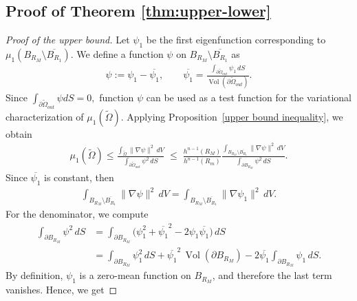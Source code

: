 \documentclass[12pt,reqno]{amsart}
\numberwithin{equation}{section}
\numberwithin{theorem}{section}
\numberwithin{equation}{section}
\numberwithin{theorem}{section}
\begin{document}


\subsection{Proof of  Theorem \ref{thm:upper-lower}}
\begin{proof} [Proof of the upper bound]
Let $\psi_1$ be the first eigenfunction corresponding to $\mu_1\!\left(B_{R_M}\setminus \overline{B_{R_1}}\right)$.  
We define a function $\psi$ on $B_{R_M}\setminus\overline{B_{R_1}}$ as
\begin{align*}
   \psi := \psi_1 - \overline{\psi_1}, 
\qquad 
\overline{\psi_1} = \frac{\displaystyle \int_{\partial \tilde{\Omega}_{out}} \psi_1 \, dS}{\operatorname{Vol}(\partial \tilde{\Omega}_{out})}. 
\end{align*}
Since $\int_{\partial\tilde{\Omega}_{out}} \psi dS=0,$ function $\psi$ can be used as a test function for the variational characterization of $\mu_1(\tilde{\Omega}).$
Applying Proposition~\ref{upper bound inequality}, we obtain
\begin{align} \label{inequality for upper bound}
       \mu_1(\tilde{\Omega})\leq \frac{\displaystyle \int_{\tilde{\Omega}}\|\nabla\psi\|^2 \, dV}{\displaystyle \int_{\partial\tilde{\Omega}_{out}}\psi^2 \, dS} 
        \;\leq\; 
        \frac{h^{n-1}(R_M)}{h^{n-1}(R_m)} 
        \frac{\displaystyle \int_{B_{R_M}\setminus \overline{B_{R_1}}}\|\nabla\psi\|^2 \, dV}{\displaystyle \int_{\partial B_{R_M}}\psi^2 \, dS}.
\end{align}
Since $\overline{\psi_1}$ is constant, then
\begin{align}
    \int_{B_{R_M}\setminus \overline{B_{R_1}}} \|\nabla \psi\|^2 \, dV
    = \int_{B_{R_M}\setminus \overline{B_{R_1}}} \|\nabla \psi_1\|^2 \, dV. \label{equality 1}
\end{align}
For the denominator, we compute
\begin{align*}
    \int_{\partial B_{R_M}} \psi^2 \, dS 
    &= \int_{\partial B_{R_M}} \big(\psi_1^2 + \overline{\psi_1}^2 - 2\psi_1 \overline{\psi_1}\big) \, dS \\
    &= \int_{\partial B_{R_M}} \psi_1^2 \, dS 
       + \overline{\psi_1}^2 \, \operatorname{Vol}(\partial B_{R_M})
       - 2 \overline{\psi_1}\int_{\partial B_{R_M}} \psi_1 \, dS.
\end{align*}
By definition, $\psi_1$ is a zero-mean function on $B_{R_M}$, and therefore the last term vanishes. Hence, we get

\end{proof}
\end{document}
